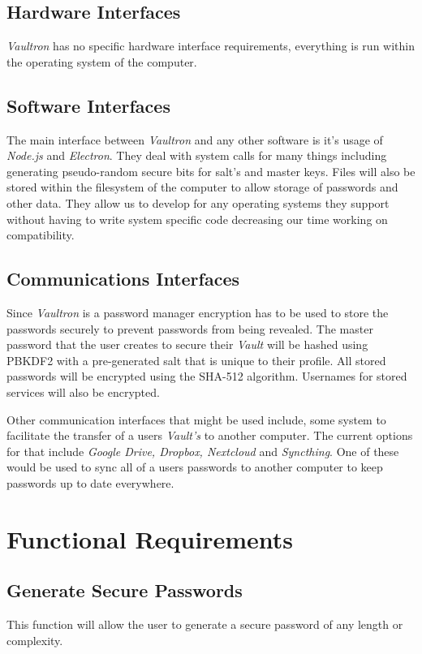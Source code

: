 \documentclass[11pt]{report}
\begin{document}
\subsection{Hardware Interfaces}
\textit{Vaultron} has no specific hardware interface requirements, everything is
run within the operating system of the computer. 


\subsection{Software Interfaces}
The main interface between \textit{Vaultron} and any other software is it's
usage of \textit{Node.js} and \textit{Electron}. They deal with system calls 
for many things including generating pseudo-random secure bits for salt's and 
master keys. Files will also be stored within the filesystem of the computer 
to allow storage of passwords and other data. They allow us to develop for
any operating systems they support without having to write system specific
code decreasing our time working on compatibility. 


\subsection{Communications Interfaces}
Since \textit{Vaultron} is a password manager encryption has to be used
to store the passwords securely to prevent passwords from being revealed.
The master password that the user creates to secure their \textit{Vault}
will be hashed using PBKDF2 with a pre-generated salt that is unique to
their profile. All stored passwords will be encrypted using the SHA-512 
algorithm. Usernames for stored services will also be encrypted.


Other communication interfaces that might be used include, some system
to facilitate the transfer of a users \textit{Vault's} to another computer.
The current options for that include \textit{Google Drive, Dropbox, Nextcloud}
and \textit{Syncthing}. One of these would be used to sync all of a users
passwords to another computer to keep passwords up to date everywhere.


\section{Functional Requirements}
\subsection{Generate Secure Passwords}
This function will allow the user to generate a secure password of any length or 
complexity.
\end{document}
